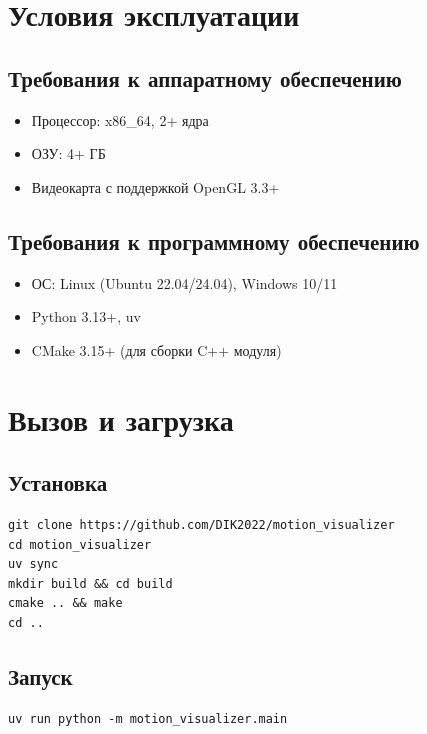 \documentclass[a4paper,14pt]{extarticle}
\begin{document}
\section{Условия эксплуатации}

\subsection{Требования к аппаратному обеспечению}
\begin{itemize}
    \item Процессор: x86\_64, 2+ ядра
    \item ОЗУ: 4+ ГБ
    \item Видеокарта с поддержкой OpenGL 3.3+
\end{itemize}

\subsection{Требования к программному обеспечению}
\begin{itemize}
    \item ОС: Linux (Ubuntu 22.04/24.04), Windows 10/11
    \item Python 3.13+, uv
    \item CMake 3.15+ (для сборки C++ модуля)
\end{itemize}

\section{Вызов и загрузка}

\subsection{Установка}
\begin{verbatim}
git clone https://github.com/DIK2022/motion_visualizer
cd motion_visualizer
uv sync
mkdir build && cd build
cmake .. && make
cd ..
\end{verbatim}

\subsection{Запуск}
\begin{verbatim}
uv run python -m motion_visualizer.main
\end{verbatim}
\end{document}
